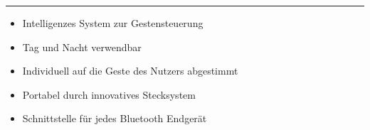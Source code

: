 \documentclass[a4paper,12pt,notumble]{leaflet}
\begin{document}
\textcolor{rwth-lblue}{\noindent\rule{\textwidth}{4pt}}

\noindent
\begin{minipage}[c][0.45\textheight][t]{\textwidth}
	\begin{itemize}
		\item Intelligenzes System zur Gestensteuerung
		\item Tag und Nacht verwendbar
		\item Individuell auf die Geste des Nutzers abgestimmt
		\item Portabel durch innovatives Stecksystem
		\item Schnittstelle für jedes Bluetooth Endgerät
	\end{itemize}
\end{minipage}

\clearpage


\end{document}
